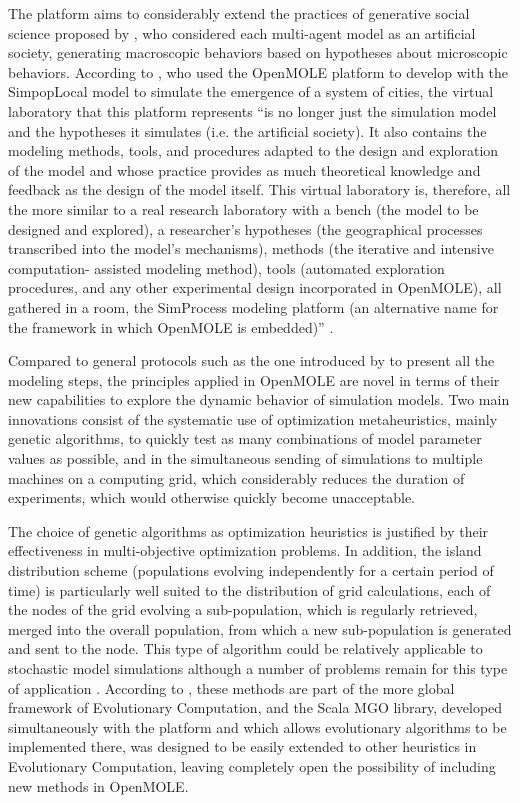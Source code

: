 \documentclass[10pt]{article}
\begin{document}
The platform aims to considerably extend the practices of generative social science proposed by \cite{epstein1996growing}, who considered each multi-agent model as an artificial society, generating macroscopic behaviors based on hypotheses about microscopic behaviors. According to \cite{schmitt2014modelisation}, who used the OpenMOLE platform to develop with \cite{rey2015plateforme} the SimpopLocal model to simulate the emergence of a system of cities, the virtual laboratory that this platform represents ``is no longer just the simulation model and the hypotheses it simulates (i.e. the artificial society). It also contains the modeling methods, tools, and procedures adapted to the design and exploration of the model and whose practice provides as much theoretical knowledge and feedback as the design of the model itself. This virtual laboratory is, therefore, all the more similar to a real research laboratory with a bench (the model to be designed and explored), a researcher’s hypotheses (the geographical processes transcribed into the model’s mechanisms), methods (the iterative and intensive computation- assisted modeling method), tools (automated exploration procedures, and any other experimental design incorporated in OpenMOLE), all gathered in a room, the SimProcess modeling platform (an alternative name for the framework in which OpenMOLE is embedded)'' \citep{rey2015plateforme}.

Compared to general protocols such as the one introduced by \cite{grimm2005pattern} to present all the modeling steps, the principles applied in OpenMOLE are novel in terms of their new capabilities to explore the dynamic behavior of simulation models. Two main innovations consist of the systematic use of optimization metaheuristics, mainly genetic algorithms, to quickly test as many combinations of model parameter values as possible, and in the simultaneous sending of simulations to multiple machines on a computing grid, which considerably reduces the duration of experiments, which would otherwise quickly become unacceptable.

The choice of genetic algorithms as optimization heuristics is justified by their effectiveness in multi-objective optimization problems. In addition, the island distribution scheme (populations evolving independently for a certain period of time) is particularly well suited to the distribution of grid calculations, each of the nodes of the grid evolving a sub-population, which is regularly retrieved, merged into the overall population, from which a new sub-population is generated and sent to the node. This type of algorithm could be relatively applicable to stochastic model simulations although a number of problems remain for this type of application \citep{rakshit2017noisy}. According to \cite{rey2015plateforme}, these methods are part of the more global framework of Evolutionary Computation, and the Scala MGO library, developed simultaneously with the platform and which allows evolutionary algorithms to be implemented there, was designed to be easily extended to other heuristics in Evolutionary Computation, leaving completely open the possibility of including new methods in OpenMOLE.
\end{document}
